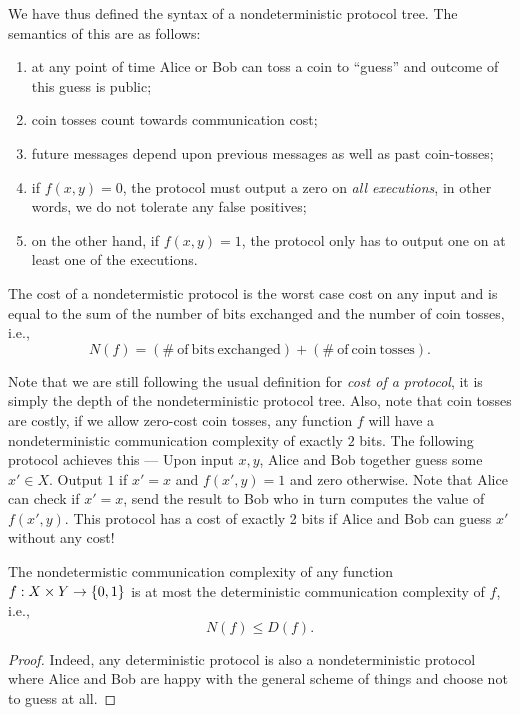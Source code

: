 \documentclass[usletter]{article}
\providecommand\cbrac[1]{\ensuremath \left\{#1\right\}}
\newcommand{\X}{X}
\newcommand{\Y}{Y}
\newcommand{\df}{D(f)}
\newcommand{\nf}{N(f)}
\begin{document}
We have thus defined the syntax of a nondeterministic protocol tree. The semantics of this are as follows:
\begin{enumerate}
    \item at any point of time Alice or Bob can toss a coin to ``guess'' and outcome of this guess is public;
    \item coin tosses count towards communication cost;
    \item future messages depend upon previous messages as well as past coin-tosses;
    \item if $f(x, y) = 0$, the protocol must output a zero on \emph{all executions}, in other words, we do not tolerate any false positives;
    \item on the other hand, if $f(x, y) = 1$, the protocol only has to output one on at least one of the executions.
\end{enumerate}

\begin{definition}
\label{def:nondet_cost}
The cost of a nondetermistic protocol is the worst case cost on any input and is equal to the sum of the number of bits exchanged and the number of coin tosses, i.e.,
$$
\nf = (\mathrm{\#\ of\ bits\ exchanged}) + (\mathrm{\#\ of\ coin\ tosses}).
$$
\end{definition}
\begin{remark}
Note that we are still following the usual definition for \emph{cost of a protocol}, it is simply the depth of the nondeterministic protocol tree. Also, note that coin tosses are costly, if we allow zero-cost coin tosses, any function $f$ will have a nondeterministic communication complexity of exactly $2$ bits. The following protocol achieves this --- Upon input $x, y$, Alice and Bob together guess some $x' \in \X$. Output $1$ if $x' = x$ and $f(x', y) = 1$ and zero otherwise. Note that Alice can check if $x' = x$, send the result to Bob who in turn computes the value of $f(x', y)$. This protocol has a cost of exactly 2 bits if Alice and Bob can guess $x'$ without any cost!
\end{remark}

\begin{proposition}
The nondetermistic communication complexity of any function $f : \X \times \Y \to \cbrac{0,1}$ is at most the deterministic communication complexity of $f$, i.e.,
$$
\nf \leq \df.
$$
\end{proposition}
\begin{proof}
Indeed, any deterministic protocol is also a nondeterministic protocol where Alice and Bob are happy with the general scheme of things and choose not to guess at all.
\end{proof}
\end{document}
